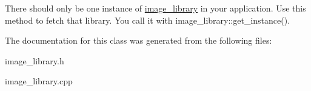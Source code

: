 There should only be one instance of \hyperlink{classcsis3700_1_1image__library}{image\+\_\+library} in your application. Use this method to fetch that library. You call it with image\+\_\+library\+::get\+\_\+instance(). 

The documentation for this class was generated from the following files\+:\begin{DoxyCompactItemize}
\item 
image\+\_\+library.\+h\item 
image\+\_\+library.\+cpp\end{DoxyCompactItemize}
